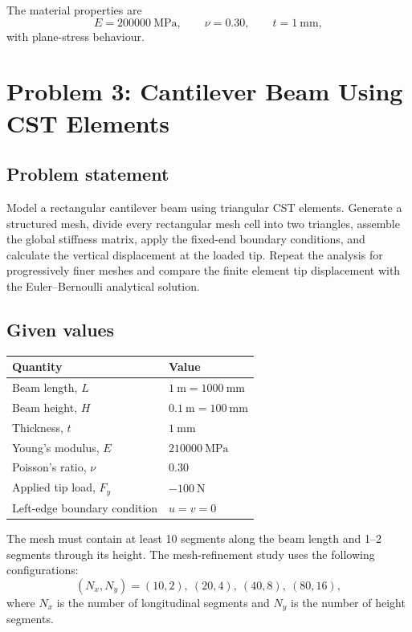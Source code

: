 \documentclass[12pt,a4paper]{article}
\begin{document}
The material properties are
\[
E=\SI{200000}{\mega\pascal},\qquad
\nu=0.30,\qquad
t=\SI{1}{\milli\metre},
\]
with plane-stress behaviour.

\section{Problem 3: Cantilever Beam Using CST Elements}

\subsection*{Problem statement}

Model a rectangular cantilever beam using triangular CST elements. Generate a
structured mesh, divide every rectangular mesh cell into two triangles,
assemble the global stiffness matrix, apply the fixed-end boundary
conditions, and calculate the vertical displacement at the loaded tip.
Repeat the analysis for progressively finer meshes and compare the finite
element tip displacement with the Euler--Bernoulli analytical solution.

\subsection*{Given values}

\begin{table}[h!]
\centering
\begin{tabular}{ll}
\toprule
\textbf{Quantity} & \textbf{Value} \\
\midrule
Beam length, $L$ & $\SI{1}{\metre}=\SI{1000}{\milli\metre}$ \\
Beam height, $H$ & $\SI{0.1}{\metre}=\SI{100}{\milli\metre}$ \\
Thickness, $t$ & $\SI{1}{\milli\metre}$ \\
Young's modulus, $E$ & $\SI{210000}{\mega\pascal}$ \\
Poisson's ratio, $\nu$ & $0.30$ \\
Applied tip load, $F_y$ & $-\SI{100}{\newton}$ \\
Left-edge boundary condition & $u=v=0$ \\
\bottomrule
\end{tabular}
\end{table}

The mesh must contain at least 10 segments along the beam length and 1--2
segments through its height. The mesh-refinement study uses the following
configurations:
\[
(N_x,N_y)=(10,2),\ (20,4),\ (40,8),\ (80,16),
\]
where $N_x$ is the number of longitudinal segments and $N_y$ is the number
of height segments.
\end{document}
